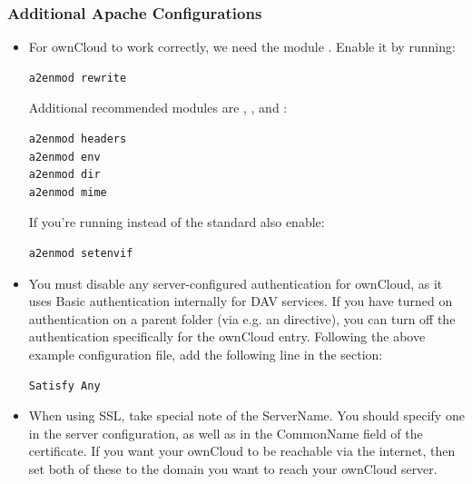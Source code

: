 \documentclass[letterpaper,10pt,english]{sphinxmanual}
\begin{document}
\subsubsection{Additional Apache Configurations}
\label{installation/source_installation:additional-apache-configurations}\begin{itemize}
\item {} 
For ownCloud to work correctly, we need the module . Enable it
by running:

\begin{Verbatim}[commandchars=\\\{\}]
a2enmod rewrite
\end{Verbatim}

Additional recommended modules are , ,  and :

\begin{Verbatim}[commandchars=\\\{\}]
a2enmod headers
a2enmod env
a2enmod dir
a2enmod mime
\end{Verbatim}

If you're running  instead of the standard  also enable:

\begin{Verbatim}[commandchars=\\\{\}]
a2enmod setenvif
\end{Verbatim}

\item {} 
You must disable any server-configured authentication for ownCloud, as it
uses Basic authentication internally for DAV services. If you have turned on
authentication on a parent folder (via e.g. an 
directive), you can turn off the authentication specifically for the ownCloud
entry. Following the above example configuration file, add the following line
in the  section:

\begin{Verbatim}[commandchars=\\\{\}]
Satisfy Any
\end{Verbatim}

\item {} 
When using SSL, take special note of the ServerName. You should specify one in
the  server configuration, as well as in the CommonName field of the
certificate. If you want your ownCloud to be reachable via the internet, then
set both of these to the domain you want to reach your ownCloud server.


\end{itemize}
\end{document}
